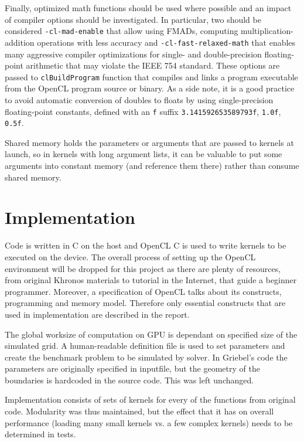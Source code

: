 Finally, optimized math functions should be used where possible and an impact of compiler options should be investigated. In particular, two should be considered \texttt{-cl-mad-enable} that allow using FMADs, computing multiplication-addition operations with less accuracy and \texttt{-cl-fast-relaxed-math} that enables many aggressive compiler optimizations for single- and double-precision floating-point arithmetic that may violate the IEEE 754 standard. These options are passed to \texttt{clBuildProgram} function that compiles and links a program executable from the OpenCL program source or binary.\cite{nvidia2011openclbest, nvidia2012openclprog} As a side note, it is a good practice to avoid automatic conversion of doubles to floats by using single-precision floating-point constants, defined with an \texttt{f} suffix \texttt{3.141592653589793f}, \texttt{1.0f}, \texttt{0.5f}.

Shared memory holds the parameters or arguments that are passed to kernels at launch, so in kernels with long argument lists, it can be valuable to put some arguments into constant memory (and reference them there) rather than consume shared memory.

\section{Implementation}
Code is written in C on the host and OpenCL C is used to write kernels to be executed on the device. The overall process of setting up the OpenCL environment will be dropped for this project as there are plenty of resources, from original Khronos materials to tutorial in the Internet, that guide a beginner programmer. Moreover, a specification of OpenCL talks about its constructs, programming and memory model. Therefore only essential constructs that are used in implementation are described in the report. 

The global worksize of computation on GPU is dependant on specified size of the simulated grid. A human-readable definition file is used to set parameters and create the benchmark problem to be simulated by solver. In Griebel's code the parameters are originally specified in inputfile, but the geometry of the boundaries is hardcoded in the source code. This was left unchanged.

Implementation consists of sets of kernels for every of the functions from original code. Modularity was thus maintained, but the effect that it has on overall performance (loading many small kernels vs. a few complex kernels) needs to be determined in tests.

